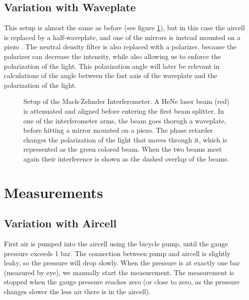 \subsection{Variation with Waveplate}
This setup is almost the same as before (see figure \ref{fig:setup_with_waveplate}), but in this case the aircell is replaced by a half-waveplate, 
and one of the mirrors is instead mounted on a piezo \autocite{piezo}.
The neutral density filter is also replaced with a polarizer, 
because the polarizer can decrease the intensity, while also allowing us to enforce the polarization of the light.
This polarization angle will later be relevant in calculations of the angle between the fast axis of the waveplate and the polarization of the light.
\begin{figure}
    \centering
    
    \caption{Setup of the Mach-Zehnder Interferometer. 
    A HeNe laser beam (red) is attenuated and aligned before entering the first beam splitter. 
    In one of the interferometer arms, the beam goes thorugh a waveplate, before hitting a mirror mounted on a piezo.
    The phase retarder changes the polarization of the light that moves through it, which is represented as the green colored beam. 
    When the two beams meet again their interference is shown as the dashed overlap of the beams.}
    \label{fig:setup_with_waveplate}
\end{figure}
\section{Measurements}
\subsection{Variation with Aircell}
First air is pumped into the aircell using the bicycle pump, 
until the gauge pressure exceeds 1 bar. 
The connection between pump and aircell is slightly leaky,
so the pressure will drop slowly. When the pressure is at exactly one bar (measured by eye),
we manually start the measurement. 
The measurement is stopped when the gauge pressure reaches zero (or close to zero, as the pressure changes slower the less air there is in the aircell).
